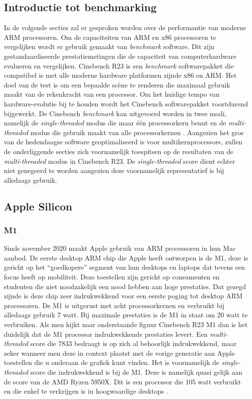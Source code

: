 \subsection{Introductie tot benchmarking}
In de volgende secties zal er gesproken worden over de performantie van moderne ARM processoren. Om de capaciteiten van ARM en x86 processoren te vergelijken wordt er gebruik gemaakt van \textit{benchmark} software. Dit zijn gestandaardiseerde prestatiemetingen die de capaciteit van computerhardware evalueren en vergelijken. Cinebench R23 is een \textit{benchmark} softwarepakket die compatibel is met alle moderne hardware platformen zijnde x86 en ARM. Het doel van de test is om een bepaalde scène te renderen die maximaal gebruik maakt van de rekenkracht van een processor. Om het huidige tempo van hardware-evolutie bij te houden wordt het Cinebench softwarepakket voortdurend bijgewerkt. De Cinebench \textit{benchmark} kan uitgevoerd worden in twee modi, namelijk de \textit{single-threaded} modus die maar één processorkern benut en de \textit{multi-threaded} modus die gebruik maakt van alle processorkernen \autocite{Maxon2022}. Aangezien het gros van de hedendaagse software geoptimaliseerd is voor multikernprocessors, zullen de onderliggende secties zich voornamelijk toespitsen op de resultaten van de \textit{multi-threaded} modus in Cinebench R23. De \textit{single-threaded} score dient echter niet genegeerd te worden aangezien deze voornamelijk representatief is bij alledaags gebruik.

\subsection{Apple Silicon}
\subsubsection{M1}
Sinds november 2020 maakt Apple gebruik van ARM processoren in hun Mac aanbod. De eerste desktop ARM chip die Apple heeft ontworpen is de M1, deze is gericht op het “goedkopere” segment van hun desktops en laptops dat tevens een focus heeft op mobiliteit. Deze toestellen zijn gericht op consumenten en studenten die niet noodzakelijk een nood hebben aan hoge prestaties. Dat gezegd zijnde is deze chip zeer indrukwekkend voor een eerste poging tot desktop ARM processoren. De M1 is uitgerust met acht processorkernen en verbruikt bij alledaags gebruik 7 watt. Bij maximale prestaties is de M1 in staat om 20 watt te verbruiken. Als men kijkt naar onderstaande figuur Cinebench R23 M1 dan is het duidelijk dat de M1 processor indrukwekkende prestaties levert. Een \textit{multi-threaded} score die 7833 bedraagt is op zich al behoorlijk indrukwekkend, maar zeker wanneer men deze in context plaatst met de vorige generatie aan Apple toestellen die u onderaan de grafiek kunt vinden. Het is voornamelijk de \textit{single-threaded} score die indrukwekkend is bij de M1. Deze is namelijk quasi gelijk aan de score van de AMD Ryzen 5950X. Dit is een processor die 105 watt verbruikt en die enkel te verkrijgen is in hoogwaardige desktops \autocite{Frumusanu2020a}.


